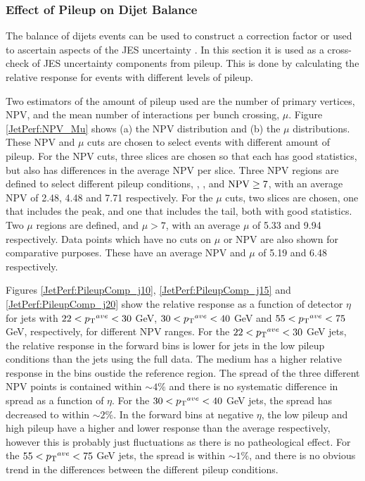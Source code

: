 \subsubsection{Effect of Pileup on Dijet Balance}

The \pt{} balance of dijets events can be used to construct a correction factor or used to ascertain aspects of the JES uncertainty \cite{ref:JES}.
In this section it is used as a cross-check of JES uncertainty components from pileup.
This is done by calculating the relative response for events with different levels of pileup.

Two estimators of the amount of pileup used are the number of primary vertices, NPV, and the mean number of interactions per bunch crossing, $\mu$.
Figure \ref{JetPerf:NPV_Mu} shows (a) the NPV distribution and (b) the $\mu$ distributions.
These NPV and $\mu$ cuts are chosen to select events with different amount of pileup.
For the NPV cuts, three slices are chosen so that each has good statistics, but also has differences in the average NPV per slice.
Three NPV regions are defined to select different pileup conditions, , , and  $\rm NPV\ge7$, with an average NPV of 2.48, 4.48 and 7.71 respectively. 
For the $\mu$ cuts, two slices are chosen, one that includes the peak, and one that includes the tail, both with good statistics. 
Two $\mu$ regions are defined,  and  $\mu > 7$, with an average $\mu$ of 5.33 and 9.94 respectively. 
Data points which have no cuts on $\mu$ or NPV are also shown for comparative purposes.
These have an average NPV and $\mu$ of 5.19 and 6.48 respectively.





Figures \ref{JetPerf:PileupComp_j10}, \ref{JetPerf:PileupComp_j15} and \ref{JetPerf:PileupComp_j20}  show the relative response as a function of detector $\eta$ for jets with $22<\mbox{$\mbox{$p_{\rm T}$}{}^{ave}$}{}<30$ GeV, $30<\mbox{$\mbox{$p_{\rm T}$}{}^{ave}$}{}<40$ GeV and $55<\mbox{$\mbox{$p_{\rm T}$}{}^{ave}$}{}<75$ GeV, respectively, for different NPV ranges.
For the $22<\mbox{$\mbox{$p_{\rm T}$}{}^{ave}$}{}<30$ GeV jets, the relative response in the forward bins is lower for jets in the low pileup conditions than the jets using the full data.
The medium has a higher relative response in the bins oustide the reference region.
The spread of the three different NPV points is contained within $\sim 4\%$ and there is no systematic difference in spread as a function of $\eta{}$.
For the $30<\mbox{$\mbox{$p_{\rm T}$}{}^{ave}$}{}<40$ GeV jets, the spread has decreased to within $\sim 2\%$. 
In the forward bins at negative $\eta$, the low pileup and high pileup have a higher and lower response than the average respectively, however this is probably just fluctuations as there is no patheological effect.
For the  $55<\mbox{$\mbox{$p_{\rm T}$}{}^{ave}$}{}<75$ GeV jets, the spread is within $\sim 1\%$, and there is no obvious trend in the differences between the different pileup conditions.

